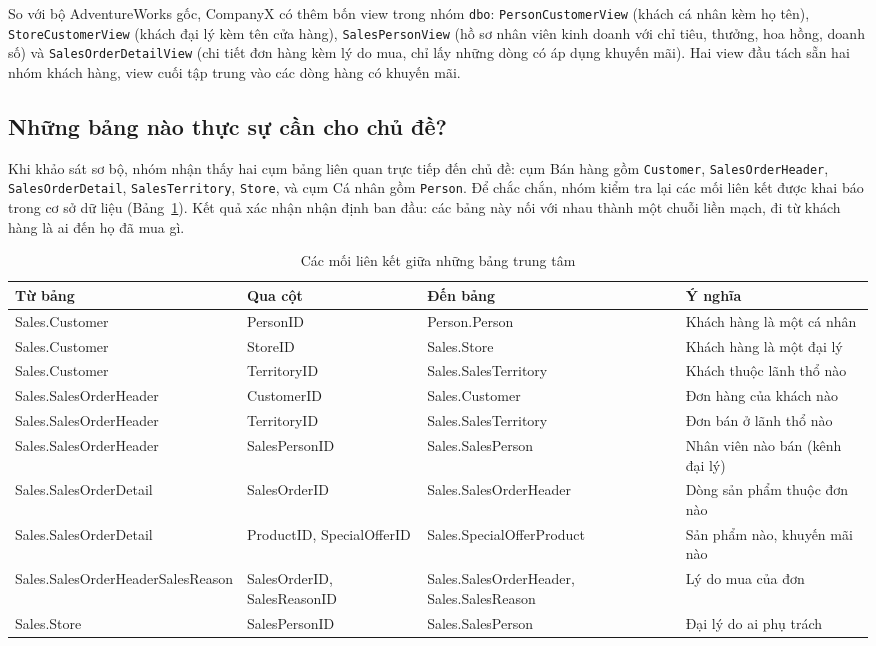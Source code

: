 So với bộ AdventureWorks gốc, CompanyX có thêm bốn view trong nhóm \texttt{dbo}: \texttt{PersonCustomerView} (khách cá nhân kèm họ tên), \texttt{StoreCustomerView} (khách đại lý kèm tên cửa hàng), \texttt{SalesPersonView} (hồ sơ nhân viên kinh doanh với chỉ tiêu, thưởng, hoa hồng, doanh số) và \texttt{SalesOrderDetailView} (chi tiết đơn hàng kèm lý do mua, chỉ lấy những dòng có áp dụng khuyến mãi). Hai view đầu tách sẵn hai nhóm khách hàng, view cuối tập trung vào các dòng hàng có khuyến mãi.

\subsection{Những bảng nào thực sự cần cho chủ đề?}
Khi khảo sát sơ bộ, nhóm nhận thấy hai cụm bảng liên quan trực tiếp đến chủ đề: cụm Bán hàng gồm \texttt{Customer}, \texttt{SalesOrderHeader}, \texttt{SalesOrderDetail}, \texttt{SalesTerritory}, \texttt{Store}, và cụm Cá nhân gồm \texttt{Person}. Để chắc chắn, nhóm kiểm tra lại các mối liên kết được khai báo trong cơ sở dữ liệu (Bảng~\ref{tab:fk}). Kết quả xác nhận nhận định ban đầu: các bảng này nối với nhau thành một chuỗi liền mạch, đi từ khách hàng là ai đến họ đã mua gì.

\begin{table}[H]
\centering
\caption{Các mối liên kết giữa những bảng trung tâm}
\label{tab:fk}
\footnotesize
\begin{tabularx}{\textwidth}{>{\raggedright\arraybackslash}p{3.8cm} >{\raggedright\arraybackslash}p{2.4cm} >{\raggedright\arraybackslash}p{4.1cm} X}
\toprule
\rowcolor{tblhead} \textbf{Từ bảng} & \textbf{Qua cột} & \textbf{Đến bảng} & \textbf{Ý nghĩa} \\
\midrule
Sales.Customer & PersonID & Person.Person & Khách hàng là một cá nhân \\
Sales.Customer & StoreID & Sales.Store & Khách hàng là một đại lý \\
Sales.Customer & TerritoryID & Sales.SalesTerritory & Khách thuộc lãnh thổ nào \\
Sales.SalesOrderHeader & CustomerID & Sales.Customer & Đơn hàng của khách nào \\
Sales.SalesOrderHeader & TerritoryID & Sales.SalesTerritory & Đơn bán ở lãnh thổ nào \\
Sales.SalesOrderHeader & SalesPersonID & Sales.SalesPerson & Nhân viên nào bán (kênh đại lý) \\
Sales.SalesOrderDetail & SalesOrderID & Sales.SalesOrderHeader & Dòng sản phẩm thuộc đơn nào \\
Sales.SalesOrderDetail & ProductID, SpecialOfferID & Sales.SpecialOffer\-Product & Sản phẩm nào, khuyến mãi nào \\
Sales.SalesOrderHeader\-SalesReason & SalesOrderID, SalesReasonID & Sales.SalesOrderHeader, Sales.Sales\-Reason & Lý do mua của đơn \\
Sales.Store & SalesPersonID & Sales.SalesPerson & Đại lý do ai phụ trách \\
\bottomrule
\end{tabularx}
\end{table}

